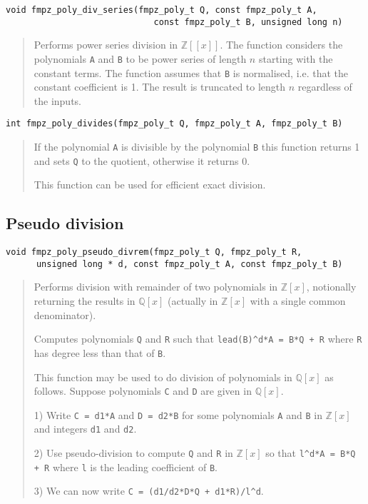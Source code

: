 \documentclass[a4paper,10pt]{article}
\newcommand{\Z}{\mathbb{Z}}
\newcommand{\Q}{\mathbb{Q}}
\newcommand{\code}{\lstinline}
\begin{document}
\begin{lstlisting}
void fmpz_poly_div_series(fmpz_poly_t Q, const fmpz_poly_t A, 
                             const fmpz_poly_t B, unsigned long n) 
\end{lstlisting}
\begin{quote}
Performs power series division in $\Z[[x]]$. The function considers the polynomials \code{A} and \code{B} to be power series of length $n$ starting with the constant terms. The function assumes that \code{B} is normalised, i.e. that the constant coefficient is 1. The result is truncated to length $n$ regardless of the inputs.
\end{quote}

\begin{lstlisting}
int fmpz_poly_divides(fmpz_poly_t Q, fmpz_poly_t A, fmpz_poly_t B)
\end{lstlisting}
\begin{quote}
If the polynomial \code{A} is divisible by the polynomial \code{B} this function returns 1 and sets \code{Q} to the quotient, otherwise it returns 0.

This function can be used for efficient exact division. 
\end{quote}

\subsection{Pseudo division}

\begin{lstlisting}
void fmpz_poly_pseudo_divrem(fmpz_poly_t Q, fmpz_poly_t R, 
      unsigned long * d, const fmpz_poly_t A, const fmpz_poly_t B)
\end{lstlisting}
\begin{quote}
Performs division with remainder of two polynomials in $\Z[x]$, notionally returning the results in $\Q[x]$ (actually in $\Z[x]$ with a single common denominator).

Computes polynomials \code{Q} and \code{R} such that \code{lead(B)^d*A = B*Q + R} where \code{R} has degree less than that of \code{B}.

This function may be used to do division of polynomials in $\Q[x]$ as follows. Suppose polynomials \code{C} and \code{D} are given in $\Q[x]$. 

1) Write \code{C = d1*A} and \code{D = d2*B} for some polynomials \code{A} and \code{B} in $\Z[x]$ and integers \code{d1} and \code{d2}.

2) Use pseudo-division to compute \code{Q} and \code{R} in $\Z[x]$ so that \code{l^d*A = B*Q + R} where \code{l} is the leading coefficient of \code{B}. 

3) We can now write \code{C = (d1/d2*D*Q + d1*R)/l^d}.
\end{quote}
\end{document}
